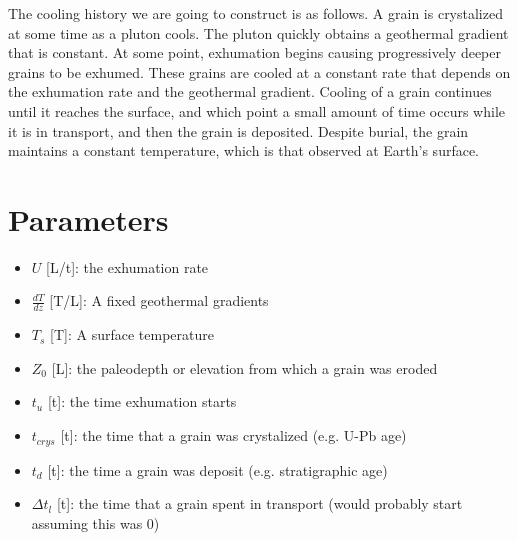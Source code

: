 \documentclass[11pt]{article}
\providecommand{\tightlist}{%
      \setlength{\itemsep}{0pt}\setlength{\parskip}{0pt}}
\begin{document}
The cooling history we are going to construct is as follows. A grain is
crystalized at some time as a pluton cools. The pluton quickly obtains a
geothermal gradient that is constant. At some point, exhumation begins
causing progressively deeper grains to be exhumed. These grains are
cooled at a constant rate that depends on the exhumation rate and the
geothermal gradient. Cooling of a grain continues until it reaches the
surface, and which point a small amount of time occurs while it is in
transport, and then the grain is deposited. Despite burial, the grain
maintains a constant temperature, which is that observed at Earth's
surface.

\section{Parameters}\label{parameters}

\begin{itemize}
\tightlist
\item
  \(U\) {[}L/t{]}: the exhumation rate
\item
  \(\frac{dT}{dz}\) {[}T/L{]}: A fixed geothermal gradients
\item
  \(T_s\) {[}T{]}: A surface temperature
\item
  \(Z_0\) {[}L{]}: the paleodepth or elevation from which a grain was
  eroded
\item
  \(t_u\) {[}t{]}: the time exhumation starts
\item
  \(t_{crys}\) {[}t{]}: the time that a grain was crystalized (e.g. U-Pb
  age)
\item
  \(t_d\) {[}t{]}: the time a grain was deposit (e.g. stratigraphic age)
\item
  \(\Delta t_l\) {[}t{]}: the time that a grain spent in transport
  (would probably start assuming this was 0)
\end{itemize}
\end{document}
